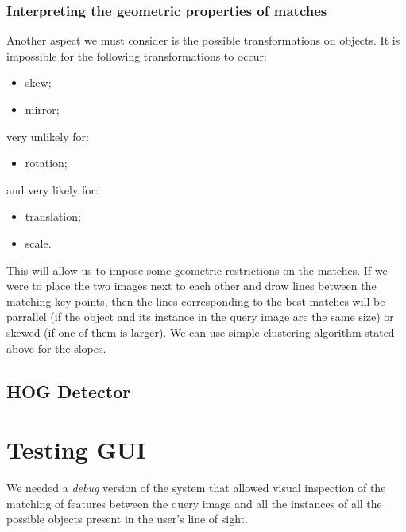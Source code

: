 \documentclass[a4paper,onecolumn,oneside,titlepage,12pt]{report}
\begin{document}
\subsubsection{Interpreting the geometric properties of matches}

Another aspect we must consider is the possible transformations on objects.
It is impossible for the following transformations to occur:
\begin{itemize}
	\item skew;
	\item mirror;
\end{itemize}
very unlikely for:
\begin{itemize}
	\item rotation;
\end{itemize}
and very likely for:
\begin{itemize}
	\item translation;
	\item scale.
\end{itemize}

This will allow us to impose some geometric restrictions on the matches. If we were to place the two images next to each other and draw lines between the matching key points, then the lines corresponding to the best matches will be parrallel (if the object and its instance in the query image are the same size) or skewed (if one of them is larger).
We can use simple clustering algorithm stated above for the slopes.

\subsection{HOG Detector}

\section{Testing GUI}
We needed a \emph{debug} version of the system that allowed visual inspection of the matching of features between the query image and all the instances of all the possible objects present in the user's line of sight.
\end{document}
